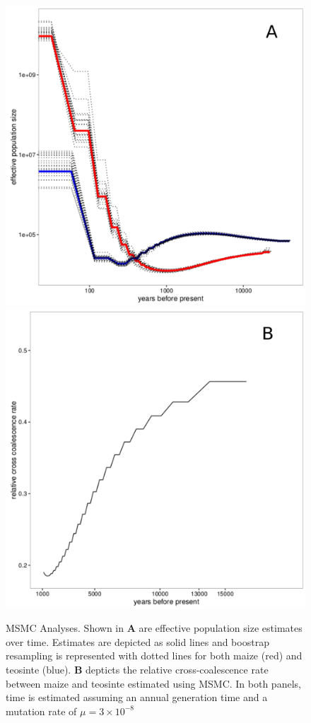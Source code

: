 \begin{figure}
  \includegraphics[width=.5\textwidth]{FigsAndFiles/TIL_BKN_bootstrapping_msmc2_labeled.pdf}
  \includegraphics[width=.5\textwidth]{FigsAndFiles/relativeCrossCoalescenceRate_labeled.pdf}
\caption{MSMC Analyses. Shown in \textbf{A} are effective population size estimates over time. Estimates are depicted as solid lines and boostrap resampling is represented with dotted lines for both maize (red) and teosinte (blue). \textbf{B} depticts the relative cross-coalescence rate between maize and teosinte estimated using MSMC. In both panels, time is estimated assuming an annual generation time and a mutation rate of $\mu=3\times 10^{-8}$ \label{sFig:msmc}}
\end{figure}
\clearpage


